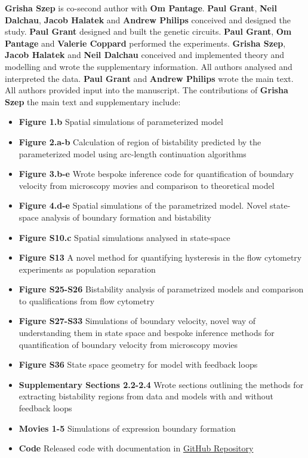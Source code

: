 \textbf{Grisha Szep} is co-second author with \textbf{Om Pantage}. \textbf{Paul Grant}, \textbf{Neil Dalchau}, \textbf{Jacob Halatek} and \textbf{Andrew Philips} conceived and designed the study. \textbf{Paul Grant} designed and built the genetic circuits. \textbf{Paul Grant}, \textbf{Om Pantage} and \textbf{Valerie Coppard} performed the experiments. \textbf{Grisha Szep}, \textbf{Jacob Halatek} and \textbf{Neil Dalchau} conceived and implemented theory and modelling and wrote the supplementary information. All authors analysed and interpreted the data. \textbf{Paul Grant} and \textbf{Andrew Philips} wrote the main text. All authors provided input into the manuscript. The contributions of \textbf{Grisha Szep} the main text and supplementary include:
\begin{itemize}
    \item \textbf{Figure 1.b} Spatial simulations of parameterized model
    \item \textbf{Figure 2.a-b} Calculation of region of bistability predicted by the parameterized model using arc-length continuation algorithms
    \item \textbf{Figure 3.b-e} Wrote bespoke inference code for quantification of boundary velocity from microscopy movies and comparison to theoretical model
    \item \textbf{Figure 4.d-e} Spatial simulations of the parametrized model. Novel state-space analysis of boundary formation and bistability
    \item \textbf{Figure S10.c} Spatial simulations analysed in state-space
    \item \textbf{Figure S13} A novel method for quantifying hysteresis in the flow cytometry experiments as population separation
    \item \textbf{Figure S25-S26} Bistability analysis of parametrized models and comparison to qualifications from flow cytometry
    \item \textbf{Figure S27-S33} Simulations of boundary velocity, novel way of understanding them in state space and bespoke inference methods for quantification of boundary velocity from microscopy movies
    \item \textbf{Figure S36} State space geometry for model with feedback loops
    \item \textbf{Supplementary Sections 2.2-2.4} Wrote sections outlining the methods for extracting bistability regions from data and models with and without feedback loops
    \item \textbf{Movies 1-5} Simulations of expression boundary formation
    \item \textbf{Code} Released code with documentation in \href{https://github.com/gszep/double-exclusive-reporter}{GitHub Repository}
\end{itemize}

